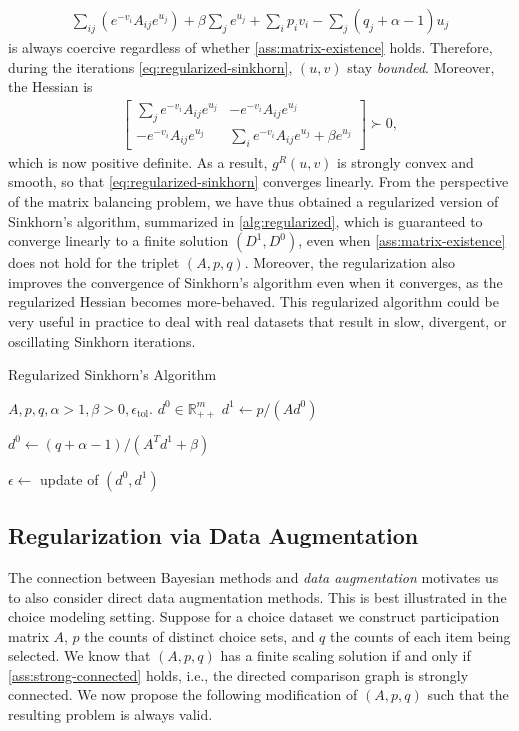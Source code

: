 \begin{align*}
    \sum_{ij}(e^{-v_{i}}A_{ij}e^{u_{j}})+\beta\sum_{j}e^{u_{j}}+\sum_{i}p_{i}v_{i}-\sum_{j}(q_{j}+\alpha-1)u_{j}
\end{align*} 
is always coercive regardless of whether \cref{ass:matrix-existence} holds. Therefore, during the iterations \eqref{eq:regularized-sinkhorn}, $(u,v)$ stay \emph{bounded}. Moreover, the Hessian is 
\begin{align*} \begin{bmatrix}\sum_{j}e^{-v_{i}}A_{ij}e^{u_{j}} & -e^{-v_{i}}A_{ij}e^{u_{j}}\\
-e^{-v_{i}}A_{ij}e^{u_{j}} & \sum_{i}e^{-v_{i}}A_{ij}e^{u_{j}}+\beta e^{u_{j}}
\end{bmatrix}	\succ0,
\end{align*}
 which is now positive definite.  As a result, $g^{R}(u,v)$ is strongly convex and smooth, so that  \eqref{eq:regularized-sinkhorn} converges linearly. From the perspective of the matrix balancing problem, we have thus obtained a regularized version of Sinkhorn's algorithm, summarized in \cref{alg:regularized}, which is guaranteed to converge linearly to a finite solution $(D^1,D^0)$, even when \cref{ass:matrix-existence} does not hold for the triplet $(A,p,q)$. Moreover, the regularization also improves the convergence of Sinkhorn's algorithm even when it converges, as the regularized Hessian becomes more-behaved. This regularized algorithm could be very useful in practice to deal with real datasets that result in slow, divergent, or oscillating Sinkhorn iterations.
 \begin{algorithm}[tb]
\caption{Regularized Sinkhorn's Algorithm}
   \label{alg:regularized}
\begin{algorithmic}
     $A, p, q,\alpha>1,\beta>0,\epsilon_{\text{tol}}$.
    $d^{0}\in\mathbb{R}_{++}^{m}$
   \REPEAT
   \STATE $d^{1} \leftarrow  p/( A d^0)$ 

   \STATE $d^{0}\leftarrow  (q+\alpha-1)/({A}^{T} d^{1}+\beta)$

   \STATE 
$\epsilon\leftarrow$  update of $(d^{0},d^1)$
\end{algorithmic}
\end{algorithm}

\subsection{Regularization via Data Augmentation}
The connection between Bayesian methods and \emph{data augmentation} motivates us to also consider direct data augmentation methods. This is best illustrated in the choice modeling setting. Suppose for a choice dataset we construct participation matrix $A$, $p$ the counts of distinct choice sets, and $q$ the counts of each item being selected. We know that $(A,p,q)$ has a finite scaling solution if and only if  \cref{ass:strong-connected} holds, i.e., the directed comparison graph is strongly connected. We now propose the following modification of $(A,p,q)$ such that the resulting problem is always valid. 

